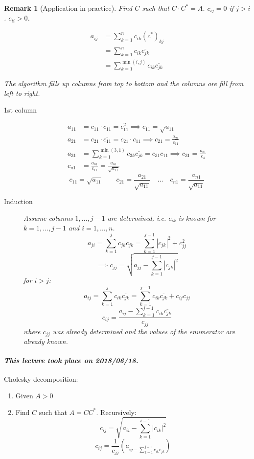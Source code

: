 \documentclass{article}
\newtheorem{remark}{Remark}  \numberwithin{remark}{section}
\newcommand{\card}[1]{\left|#1\right|}
\newcommand{\dateref}[1]{\paragraph{\textit{This lecture took place on #1.}}}
\begin{document}
\begin{remark}[Application in practice]
  Find $C$ such that $C \cdot C^* = A$.
  $c_{ij} = 0$ if $j > i$.
  $c_{ii} > 0$.

  \begin{align*}
    a_{ij} &= \sum_{k=1}^n c_{ik} (c^*)_{kj} \\
      &= \sum_{k=1}^n c_{ik} \overline{c_{jk}} \\
      &= \sum_{k=1}^{\min(i,j)} c_{ik} \overline{c_{jk}}
  \end{align*}

  The algorithm fills up columns from top to bottom and the columns are fill from left to right.

  \begin{description}
    \item[1st column] 
      \begin{align*}
        a_{11} &= c_{11} \cdot \overline{c_{11}} = c_{11}^2 \implies c_{11} = \sqrt{a_{11}} \\
        a_{21} &= c_{21} \cdot \overline{c_{11}} = c_{21} \cdot c_{11} \implies c_{21} = \frac{a_{21}}{c_{11}} \\
        a_{31} &= \sum_{k=1}^{\min(3,1)} c_{3k} \overline{c_{jk}} = c_{31} c_{11} \implies c_{31} = \frac{a_{31}}{c_4} \\
        c_{n1} &= \frac{a_{n1}}{c_{11}} = \frac{a_{n1}}{\sqrt{a_{11}}}
      \end{align*}
      \[ c_{11} = \sqrt{a_{11}} \qquad c_{21} = \frac{a_{21}}{\sqrt{a_{11}}} \quad \dots \quad c_{n1} = \frac{a_{n1}}{\sqrt{a_{11}}} \]
    \item[Induction]
      Assume columns $1, \dots, j-1$ are determined, i.e. $c_{ik}$ is known for $k = 1, \dots, j-1$ and $i = 1, \dots, n$.
      \[ a_{ji} = \sum_{k=1}^j c_{jk} \overline{c_{jk}} = \sum_{k=1}^{j-1} \card{c_{jk}}^2 + c_{jj}^2 \]
      \[ \implies c_{jj} = \sqrt{a_{jj} - \sum_{k=1}^{j-1} \card{c_{jk}}^2} \]
      for $i > j$:
      \[ a_{ij} = \sum_{k=1}^j  c_{ik} \overline{c_{jk}} = \sum_{k=1}^{j-1} c_{ik} \overline{c_{jk}} + c_{ij} c_{jj} \]
      \[ c_{ij} = \frac{a_{ij} - \sum_{k=1}^{j-1} c_{ik} \overline{c_{jk}}}{c_{jj}} \]
      where $c_{jj}$ was already determined and the values of the enumerator are already known.
  \end{description}
\end{remark}

\dateref{2018/06/18}

Cholesky decomposition:
\begin{enumerate}
  \item Given $A > 0$
  \item Find $C$ such that $A = CC^*$. Recursively:
    \[ c_{ij} = \sqrt{a_{ii} - \sum_{k=1}^{i-1} \card{c_{ik}}^2} \]
    \[ c_{ij} = \frac{1}{c_{jj}} (a_{ij - \sum_{k=1}^{j-1} c_{ik} \overline{c_{jk}}}) \]
\end{enumerate}
\end{document}
